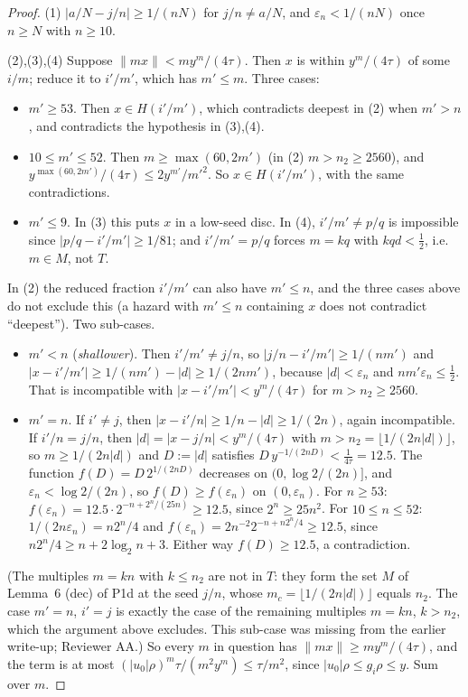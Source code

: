 \documentclass[11pt]{article}
\theoremstyle{definition}\newtheorem{definition}[theorem]{Definition}
\theoremstyle{remark}\newtheorem{remark}[theorem]{Remark}
\begin{document}
\begin{proof}
(1) $|a/N-j/n|\ge1/(nN)$ for $j/n\ne a/N$, and $\varepsilon_n<1/(nN)$ once $n\ge N$ with $n\ge10$.

(2),(3),(4) Suppose $\|mx\|<my^m/(4\tau)$. Then $x$ is within $y^m/(4\tau)$ of some $i/m$; reduce it to $i'/m'$, which has $m'\le m$. Three cases:
\begin{itemize}
\item $m'\ge53$. Then $x\in H(i'/m')$, which contradicts deepest in (2) when $m'>n$, and contradicts the hypothesis in (3),(4).
\item $10\le m'\le52$. Then $m\ge\max(60,2m')$ (in (2) $m>n_2\ge2560$), and $y^{\max(60,2m')}/(4\tau)\le2y^{m'}/m'^2$. So $x\in H(i'/m')$, with the same contradictions.
\item $m'\le9$. In (3) this puts $x$ in a low-seed disc. In (4), $i'/m'\ne p/q$ is impossible since $|p/q-i'/m'|\ge1/81$; and $i'/m'=p/q$ forces $m=kq$ with $kqd<\frac12$, i.e.\ $m\in M$, not $T$.
\end{itemize}
In (2) the reduced fraction $i'/m'$ can also have $m'\le n$, and the three cases above do not exclude this (a hazard with $m'\le n$ containing $x$ does not contradict ``deepest''). Two sub-cases.
\begin{itemize}
\item $m'<n$ (\emph{shallower}). Then $i'/m'\ne j/n$, so $|j/n-i'/m'|\ge1/(nm')$ and $|x-i'/m'|\ge1/(nm')-|d|\ge1/(2nm')$, because $|d|<\varepsilon_n$ and $nm'\varepsilon_n\le\frac12$. That is incompatible with $|x-i'/m'|<y^m/(4\tau)$ for $m>n_2\ge2560$.
\item $m'=n$. If $i'\ne j$, then $|x-i'/n|\ge1/n-|d|\ge1/(2n)$, again incompatible. If $i'/n=j/n$, then $|d|=|x-j/n|<y^m/(4\tau)$ with $m>n_2=\lfloor1/(2n|d|)\rfloor$, so $m\ge1/(2n|d|)$ and $D:=|d|$ satisfies $D\,y^{-1/(2nD)}<\frac1{4\tau}=12.5$. The function $f(D)=D\,2^{1/(2nD)}$ decreases on $(0,\log2/(2n)]$, and $\varepsilon_n<\log2/(2n)$, so $f(D)\ge f(\varepsilon_n)$ on $(0,\varepsilon_n)$. For $n\ge53$: $f(\varepsilon_n)=12.5\cdot2^{-n+2^n/(25n)}\ge12.5$, since $2^n\ge25n^2$. For $10\le n\le52$: $1/(2n\varepsilon_n)=n2^n/4$ and $f(\varepsilon_n)=2n^{-2}2^{-n+n2^n/4}\ge12.5$, since $n2^n/4\ge n+2\log_2n+3$. Either way $f(D)\ge12.5$, a contradiction.
\end{itemize}
(The multiples $m=kn$ with $k\le n_2$ are not in $T$: they form the set $M$ of Lemma~6 (dec) of P1d at the seed $j/n$, whose $m_c=\lfloor1/(2n|d|)\rfloor$ equals $n_2$. The case $m'=n$, $i'=j$ is exactly the case of the remaining multiples $m=kn$, $k>n_2$, which the argument above excludes. This sub-case was missing from the earlier write-up; Reviewer AA.)
So every $m$ in question has $\|mx\|\ge my^m/(4\tau)$, and the term is at most $(|u_0|\rho)^m\tau/(m^2y^m)\le\tau/m^2$, since $|u_0|\rho\le g_i\rho\le y$. Sum over $m$.
\end{proof}
\end{document}
